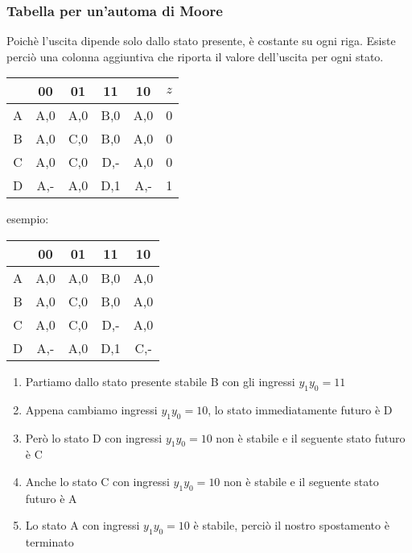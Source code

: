 \documentclass{article}
\begin{document}
\subsubsection{Tabella per un'automa di Moore}

Poichè l'uscita dipende solo dallo stato presente, è costante su ogni riga.
Esiste perciò una colonna aggiuntiva che riporta il valore dell'uscita per ogni stato.

\begin{center}
\begin{tabular}{ |c|c|c|c|c|c| }
\hline
& 00 & 01 & 11 & 10 & $z$ \\
\hline
\hline
A & A,0 & A,0 & B,0 & A,0 & 0 \\
B & A,0 & C,0 & B,0 & A,0 & 0 \\
C & A,0 & C,0 & D,- & A,0 & 0 \\
D & A,- & A,0 & D,1 & A,- & 1 \\
\hline
\end{tabular}
\end{center}

\noindent
esempio:

\begin{center}
\begin{tabular}{ |c|c|c|c|c| }
\hline
& 00 & 01 & 11 & 10 \\
\hline
\hline
A & A,0 & A,0 & B,0 & A,0 \\
B & A,0 & C,0 & B,0 & A,0 \\
C & A,0 & C,0 & D,- & A,0 \\
D & A,- & A,0 & D,1 & C,- \\
\hline
\end{tabular}
\end{center}

\begin{enumerate}
    \item Partiamo dallo stato presente stabile B con gli ingressi $y_1y_0 = 11$
    \item Appena cambiamo ingressi $y_1y_0 = 10$, lo stato immediatamente futuro è D
    \item Però lo stato D con ingressi $y_1y_0 = 10$ non è stabile e il seguente stato futuro è C
    \item Anche lo stato C con ingressi $y_1y_0 = 10$ non è stabile e il seguente stato futuro è A
    \item Lo stato A con ingressi $y_1y_0 = 10$ è stabile, perciò il nostro spostamento è terminato
\end{enumerate}
\end{document}
